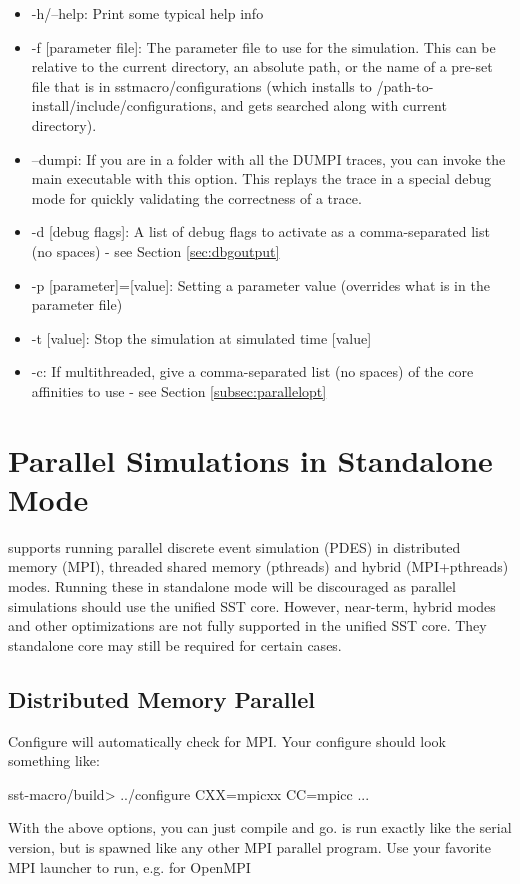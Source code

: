 \begin{itemize}
\item -h/--help: Print some typical help info
\item -f [parameter file]: The parameter file to use for the simulation.  
This can be relative to the current directory, an absolute path, or the name of a pre-set file that is in sstmacro/configurations 
(which installs to /path-to-install/include/configurations, and gets searched along with current directory). 
\item --dumpi: If you are in a folder with all the DUMPI traces, you can invoke the main  executable with this option.  This replays the trace in a special debug mode for quickly validating the correctness of a trace.
\item -d [debug flags]: A list of debug flags to activate as a comma-separated list (no spaces) - see Section \ref{sec:dbgoutput}
\item -p [parameter]=[value]: Setting a parameter value (overrides what is in the parameter file)
\item -t [value]: Stop the simulation at simulated time [value]
\item -c: If multithreaded, give a comma-separated list (no spaces) of the core affinities to use - see Section \ref{subsec:parallelopt}
\end{itemize}

\section{Parallel Simulations in Standalone Mode}
\label{sec:PDES}

\sstmacro supports running parallel discrete event simulation (PDES) in distributed memory (MPI), threaded shared memory (pthreads) and hybrid (MPI+pthreads) modes.  Running these in standalone mode will be discouraged as parallel simulations should use the unified SST core. However, near-term, hybrid modes and other optimizations are not fully supported in the unified SST core. They standalone core may still be required for certain cases.

\subsection{Distributed Memory Parallel}
\label{subsec:mpiparallel}
Configure will automatically check for MPI.
Your configure should look something like:

\begin{ShellCmd}
sst-macro/build> ../configure CXX=mpicxx CC=mpicc ...
\end{ShellCmd}
With the above options, you can just compile and go.
\sstmacro is run exactly like the serial version, but is spawned like any other MPI parallel program.
Use your favorite MPI launcher to run, e.g. for OpenMPI

